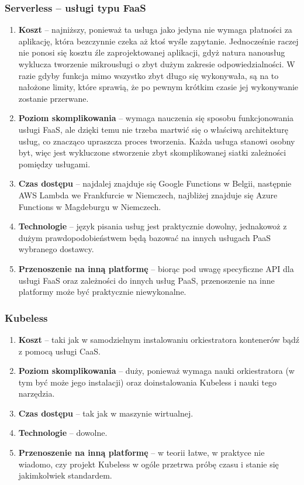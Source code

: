 \documentclass[12pt,a4paper,twoside,titlepage,openright]{book}
\begin{document}
\subsubsection{Serverless -- usługi typu FaaS}

\begin{enumerate}
	\item \textbf{Koszt} -- najniższy, ponieważ ta usługa jako jedyna nie wymaga płatności za aplikację, która bezczynnie czeka aż ktoś wyśle zapytanie. Jednocześnie raczej nie ponosi się kosztu źle zaprojektowanej aplikacji, gdyż natura nanousług wyklucza tworzenie mikrousługi o zbyt dużym zakresie odpowiedzialności. W razie gdyby funkcja mimo wszystko zbyt długo się wykonywała, są na to nałożone limity, które sprawią, że po pewnym krótkim czasie jej wykonywanie zostanie przerwane.
	\item \textbf{Poziom skomplikowania} -- wymaga nauczenia się sposobu funkcjonowania usługi FaaS, ale dzięki temu nie trzeba martwić się o właściwą architekturę usług, co znacząco upraszcza proces tworzenia. Każda usługa stanowi osobny byt, więc jest wykluczone stworzenie zbyt skomplikowanej siatki zależności pomiędzy usługami.
	\item \textbf{Czas dostępu} -- najdalej znajduje się Google Functions w Belgii, następnie  AWS Lambda we Frankfurcie w Niemczech, najbliżej znajduje się Azure Functions w Magdeburgu w Niemczech.
	\item \textbf{Technologie} -- język pisania usług jest praktycznie dowolny, jednakowoż z dużym prawdopodobieństwem będą bazować na innych usługach PaaS wybranego dostawcy.
	\item \textbf{Przenoszenie na inną platformę} -- biorąc pod uwagę specyficzne API dla usługi FaaS oraz zależności do innych usług PaaS, przenoszenie na inne platformy może być praktycznie niewykonalne.
\end{enumerate}

\subsubsection{Kubeless}

\begin{enumerate}
	\item \textbf{Koszt} -- taki jak w samodzielnym instalowaniu orkiestratora kontenerów bądź z pomocą usługi CaaS.
	\item \textbf{Poziom skomplikowania} -- duży, ponieważ wymaga nauki orkiestratora (w tym być może jego instalacji) oraz doinstalowania Kubeless i nauki tego narzędzia.
	\item \textbf{Czas dostępu} -- tak jak w maszynie wirtualnej.
	\item \textbf{Technologie} -- dowolne.
	\item \textbf{Przenoszenie na inną platformę} -- w teorii łatwe, w praktyce nie wiadomo, czy projekt Kubeless w ogóle przetrwa próbę czasu i stanie się jakimkolwiek standardem.
\end{enumerate}
\end{document}
